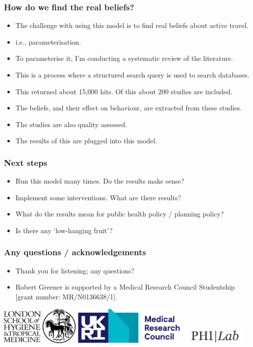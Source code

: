 \documentclass[aspectratio=169]{beamer}
\begin{document}
\begin{frame}
    \frametitle{How do we find the real beliefs?}
    \begin{itemize}
        \item The challenge with using this model is to find real beliefs about active travel.
        \item i.e., parameterisation.
        \item To parameterise it, I'm conducting a systematic review of the literature.
        \item This is a process where a structured search query is used to search databases.
        \item This returned about 15,000 hits. Of this about 200 studies are included.
        \item The beliefs, and their effect on behaviour, are extracted from these studies.
        \item The studies are also quality assessed.
        \item The results of this are plugged into this model.
    \end{itemize}
\end{frame}

\begin{frame}
    \frametitle{Next steps}
    \begin{itemize}
        \item Run this model many times. Do the results make sense?
        \item Implement some interventions. What are there results?
        \item What do the results mean for public health policy / planning policy?
        \item Is there any `low-hanging fruit'?
    \end{itemize}
\end{frame}

\begin{frame}
    \frametitle{Any questions / acknowledgements}
    \begin{itemize}
        \item Thank you for listening; any questions?
        \item Robert Greener is supported by a Medical Research Council Studentship [grant number: MR/N0136638/1].
    \end{itemize}
    \vspace*{4em}
    \includegraphics[height=5em]{figures/LSHTM-logo-bw.jpg}
    \includegraphics[height=5em]{figures/Medical_Research_Council_logo.svg.png}
    \includegraphics[height=2em]{figures/philab.png}
\end{frame}
\end{document}
